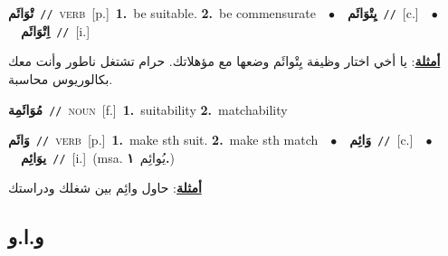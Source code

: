 \documentclass[10pt,a4paper,twoside]{article} %
\begin{document}
\begin{multicols}{2}
{\setlength\topsep{0pt}\textbf{\foreignlanguage{arabic}{تْوَائَم}}\ {\color{gray}\texttt{//}\color{black}}\ \textsc{verb}\ [p.]\ \textbf{1.}~be suitable.  \textbf{2.}~be commensurate\ \ $\bullet$\ \ \setlength\topsep{0pt}\textbf{\foreignlanguage{arabic}{يِتْوَائَم}}\ {\color{gray}\texttt{//}\color{black}}\ [c.]\ \ $\bullet$\ \ \setlength\topsep{0pt}\textbf{\foreignlanguage{arabic}{اِتْوَائَم}}\ {\color{gray}\texttt{//}\color{black}}\ [i.]\  \begin{flushright}\color{gray}\foreignlanguage{arabic}{\textbf{\underline{\foreignlanguage{arabic}{أمثلة}}}: يا أخي اختار وظيفة يِتْوائَم وضعها مع مؤهلاتك. حرام تشتغل ناطور وأنت معك بكالوريوس محاسبة.}\end{flushright}\color{black}} \vspace{2mm}

{\setlength\topsep{0pt}\textbf{\foreignlanguage{arabic}{مُوَائَمِة}}\ {\color{gray}\texttt{//}\color{black}}\ \textsc{noun}\ [f.]\ \textbf{1.}~suitability  \textbf{2.}~matchability\ } \vspace{2mm}

{\setlength\topsep{0pt}\textbf{\foreignlanguage{arabic}{وَائَم}}\ {\color{gray}\texttt{//}\color{black}}\ \textsc{verb}\ [p.]\ \textbf{1.}~make sth suit.  \textbf{2.}~make sth match\ \ $\bullet$\ \ \setlength\topsep{0pt}\textbf{\foreignlanguage{arabic}{وَائِم}}\ {\color{gray}\texttt{//}\color{black}}\ [c.]\ \ $\bullet$\ \ \setlength\topsep{0pt}\textbf{\foreignlanguage{arabic}{يوَائِم}}\ {\color{gray}\texttt{//}\color{black}}\ [i.]\ \color{gray}(msa. \foreignlanguage{arabic}{يُوائِم}~\foreignlanguage{arabic}{\textbf{١.}})\color{black}\  \begin{flushright}\color{gray}\foreignlanguage{arabic}{\textbf{\underline{\foreignlanguage{arabic}{أمثلة}}}: حاول وائِم بين شغلك ودراستك}\end{flushright}\color{black}} \vspace{2mm}

\vspace{-3mm}
\subsection*{\color{blue}\foreignlanguage{arabic}{و.ا.و}\color{blue}{ (ntws)}} 


\end{multicols}
\end{document}
